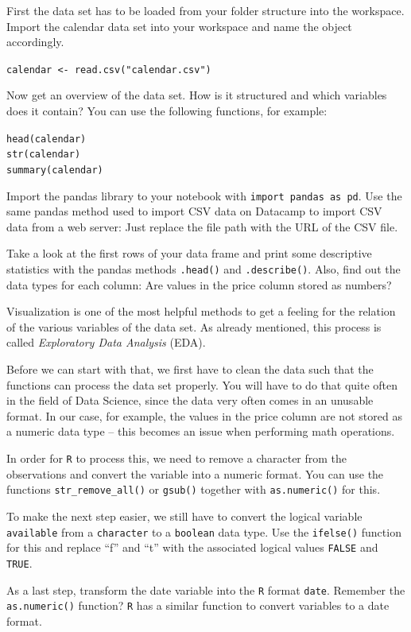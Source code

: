 \documentclass[
  11pt,
]{article}
\newenvironment{tips}[1]
  {
  \begin{itemize}
  \footnotesize
  \renewcommand{\labelitemi}{
    \raisebox{-.7\height}[0pt][0pt]{
      {\setkeys{Gin}{width=3em,keepaspectratio}
        \texttt{[image: images/\#1.png]}}
    }
  }
  \setlength{\fboxsep}{1em}
  \begin{rbox}
  \item
  }
  {
  \end{rbox}
  \end{itemize}
  }
\newenvironment{tipsp}[1]
  {
  \begin{itemize}
  \footnotesize
  \renewcommand{\labelitemi}{
    \raisebox{-.7\height}[0pt][0pt]{
      {\setkeys{Gin}{width=3em,keepaspectratio}
        \texttt{[image: images/\#1.png]}}
    }
  }
  \setlength{\fboxsep}{1em}
  \begin{pbox}
  \item
  }
  {
  \end{pbox}
  \end{itemize}
  }
\begin{document}
\begin{tips}r
First the data set has to be loaded from your folder structure into the workspace. Import the calendar data set into your workspace and name the object accordingly.

\texttt{calendar\ \textless{}-\ read.csv("calendar.csv")}

Now get an overview of the data set. How is it structured and which variables does it contain? You can use the following functions, for example:

\texttt{head(calendar)}~\\
\texttt{str(calendar)}~\\
\texttt{summary(calendar)}

\end{tips}

\begin{tipsp}p
Import the pandas library to your notebook with \texttt{import\ pandas\ as\ pd}. Use the same pandas method used to import CSV data on Datacamp to import CSV data from a web server: Just replace the file path with the URL of the CSV file.

Take a look at the first rows of your data frame and print some descriptive statistics with the pandas methods \texttt{.head()} and \texttt{.describe()}.
Also, find out the data types for each column: Are values in the price column stored as numbers?

\end{tipsp}

Visualization is one of the most helpful methods to get a feeling for the relation of the various variables of the data set. As already mentioned, this process is called \emph{Exploratory Data Analysis} (EDA).

Before we can start with that, we first have to clean the data such that the functions can process the data set properly. You will have to do that quite often in the field of Data Science, since the data very often comes in an unusable format. In our case, for example, the values in the price column are not stored as a numeric data type -- this becomes an issue when performing math operations.

\begin{tips}r
In order for \texttt{R} to process this, we need to remove a character from the observations and convert the variable into a numeric format. You can use the functions \texttt{str\_remove\_all()} or \texttt{gsub()} together with \texttt{as.numeric()} for this.

To make the next step easier, we still have to convert the logical variable \texttt{available} from a \texttt{character} to a \texttt{boolean} data type. Use the \texttt{ifelse()} function for this
and replace ``f'' and ``t'' with the associated logical values \texttt{FALSE} and \texttt{TRUE}.

As a last step, transform the date variable into the \texttt{R} format \texttt{date}. Remember the \texttt{as.numeric()} function? \texttt{R} has a similar function to convert variables to a date format.

\end{tips}
\end{document}
